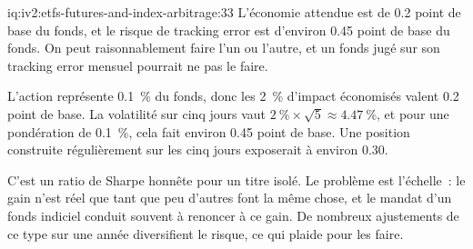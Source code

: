 \begin{solution}{iq:iv2:etfs-futures-and-index-arbitrage:33}
L'économie attendue est de 0.2 point de base du fonds, et le risque de tracking error est d'environ 0.45 point de base du fonds. On peut raisonnablement faire l'un ou l'autre, et un fonds jugé sur son tracking error mensuel pourrait ne pas le faire.

L'action représente 0.1~\% du fonds, donc les 2~\% d'impact économisés valent 0.2 point de base. La volatilité sur cinq jours vaut $2~\% \times \sqrt 5 \approx 4.47~\%$, et pour une pondération de 0.1~\%, cela fait environ 0.45 point de base. Une position construite régulièrement sur les cinq jours exposerait à environ 0.30.

C'est un ratio de Sharpe honnête pour un titre isolé. Le problème est l'échelle~: le gain n'est réel que tant que peu d'autres font la même chose, et le mandat d'un fonds indiciel conduit souvent à renoncer à ce gain. De nombreux ajustements de ce type sur une année diversifient le risque, ce qui plaide pour les faire.

\end{solution}

